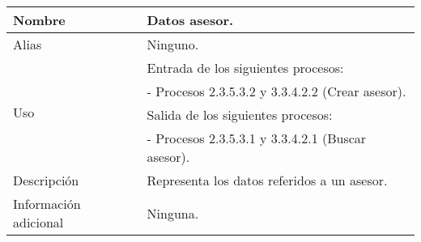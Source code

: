 \begin{center}
  \begin{tabular}{| l | p{9cm} |}
    \hline
    Nombre & \textbf{Datos asesor}.\\
    \hline
    Alias & Ninguno.\\
    \hline
    \multirow{4}{*}{Uso} & Entrada de los siguientes procesos:\\
                         & - Procesos 2.3.5.3.2 y 3.3.4.2.2 (Crear asesor).\\
                         & Salida de los siguientes procesos:\\
                         & - Procesos 2.3.5.3.1 y 3.3.4.2.1 (Buscar asesor).\\
    \hline
    Descripción & Representa los datos referidos a un asesor.\\
    \hline
    Información adicional & Ninguna.\\
    \hline
  \end{tabular}
\end{center}
